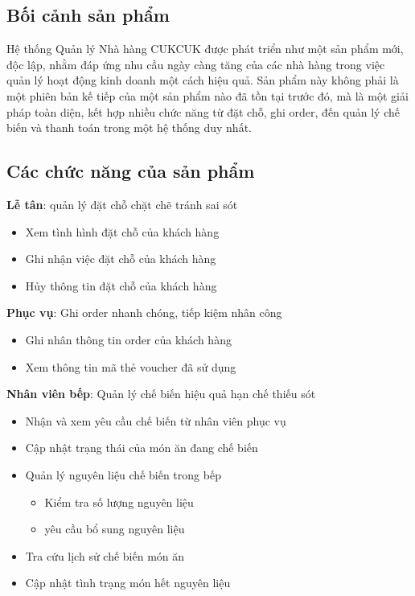 {}
\setcounter{section}{2}

\subsection{Bối cảnh sản phẩm}
Hệ thống Quản lý Nhà hàng CUKCUK được phát triển như một sản phẩm mới, độc lập, nhằm đáp ứng nhu cầu ngày càng tăng của các nhà hàng trong việc quản lý hoạt động kinh doanh một cách hiệu quả. Sản phẩm này không phải là một phiên bản kế tiếp của một sản phẩm nào đã tồn tại trước đó, mà là một giải pháp toàn diện, kết hợp nhiều chức năng từ đặt chỗ, ghi order, đến quản lý chế biến và thanh toán trong một hệ thống duy nhất.

\subsection{Các chức năng của sản phẩm}
\vspace{0.5em}
\textbf{Lễ tân}: quản lý đặt chỗ chặt chẽ tránh sai sót
\begin{itemize}[leftmargin=1.5cm, label={--}]
    \item Xem tình hình đặt chỗ của khách hàng
    \item Ghi nhận việc đặt chỗ của khách hàng
    \item Hủy thông tin đặt chỗ của khách hàng
\end{itemize}

\textbf{Phục vụ}: Ghi order nhanh chóng, tiếp kiệm nhân công
\begin{itemize}[leftmargin=1.5cm, label={--}]
    \item Ghi nhân thông tin order của khách hàng
    \item Xem thông tin mã thẻ voucher đã sử dụng
\end{itemize}

\textbf{Nhân viên bếp}: Quản lý chế biến hiệu quả hạn chế thiếu sót
\begin{itemize}[leftmargin=1.5cm, label={--}]
    \item Nhận và xem yêu cầu chế biến từ nhân viên phục vụ
    \item Cập nhật trạng thái của món ăn đang chế biến
    \item Quản lý nguyên liệu chế biến trong bếp
    \begin{itemize}[leftmargin=1cm, label={+}]
        \item Kiểm tra số lượng nguyên liệu
        \item yêu cầu bổ sung nguyên liệu  
    \end{itemize}
    \item Tra cứu lịch sử chế biến món ăn
    \item Cập nhật tình trạng món hết nguyên liệu
\end{itemize}
    
